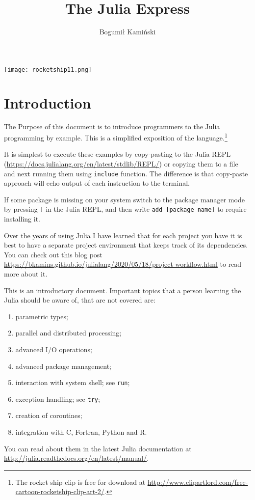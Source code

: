 \documentclass[10pt,a4paper]{article}
\begin{document}
\title{The Julia Express}
\author{Bogumił Kamiński}
\maketitle

{\centering
\texttt{[image: rocketship11.png]}\par
}

\tableofcontents

\section{Introduction}
The Purpose of this document is to introduce programmers to the Julia
programming by example. This is a simplified exposition of the
language.\footnote{The rocket ship clip is free for download at
\url{http://www.clipartlord.com/free-cartoon-rocketship-clip-art-2/}.}

It is simplest to execute these examples by copy-pasting to the Julia REPL
(\url{https://docs.julialang.org/en/latest/stdlib/REPL/}) or copying them to a
file and next running them using \lstinline|include| function. The difference is
that copy-paste approach will echo output of each instruction to the terminal.

If some package is missing on your system switch to the package manager mode by
pressing \lstinline|]| in the Julia REPL, and then write
\lstinline|add [package name]| to require installing it.

Over the years of using Julia I have learned that for each project you have it
is best to have a separate project environment that keeps track of its
dependencies. You can check out this blog post
\url{https://bkamins.github.io/julialang/2020/05/18/project-workflow.html} to
read more about it.

This is an introductory document. Important topics that a person learning the
Julia should be aware of, that are not covered are:
\begin{enumerate}[label=\arabic*),nolistsep]
  \item parametric types;
  \item parallel and distributed processing;
  \item advanced I/O operations;
  \item advanced package management;
  \item interaction with system shell; see \lstinline|run|;
  \item exception handling; see \lstinline|try|;
  \item creation of coroutines;
  \item integration with C, Fortran, Python and R.
\end{enumerate}
You can read about them in the latest Julia documentation at
\url{http://julia.readthedocs.org/en/latest/manual/}.
\end{document}
